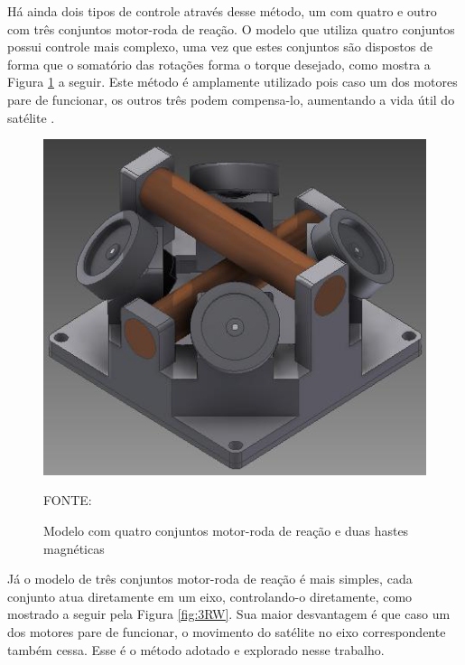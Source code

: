 \documentclass[
	12pt,				%
	openany,			%
	twoside,			%
	a4paper,			%
	english,			%
	french,				%
	spanish,			%
	brazil,				%
	oldfontcommands
	]{abntex2}
\begin{document}

Há ainda dois tipos de controle através desse método, um com quatro e outro com três conjuntos motor-roda de reação. O modelo que utiliza quatro conjuntos possui controle mais complexo, uma vez que estes conjuntos são dispostos de forma que o somatório das rotações forma o torque desejado, como mostra a Figura \ref{fig:ERW} a seguir. Este método é amplamente utilizado pois caso um dos motores pare de funcionar, os outros três podem compensa-lo, aumentando a vida útil do satélite \cite{Ericksson}.

\begin{figure}[th]
	\caption{Modelo com quatro conjuntos motor-roda de reação e duas hastes magnéticas}
	\centering
	\includegraphics[width=0.7\linewidth]{./figs/Ericksson_Reaction_Wheel}
	
	\begin{small}
		FONTE: \cite{Ericksson}
	\end{small}
	\label{fig:ERW}
\end{figure}

Já o modelo de três conjuntos motor-roda de reação é mais simples, cada conjunto atua diretamente em um eixo, controlando-o diretamente, como mostrado a seguir pela Figura \ref{fig:3RW}. Sua maior desvantagem é que caso um dos motores pare de funcionar, o movimento do satélite no eixo correspondente também cessa. Esse é o método adotado e explorado nesse trabalho.
\end{document}
